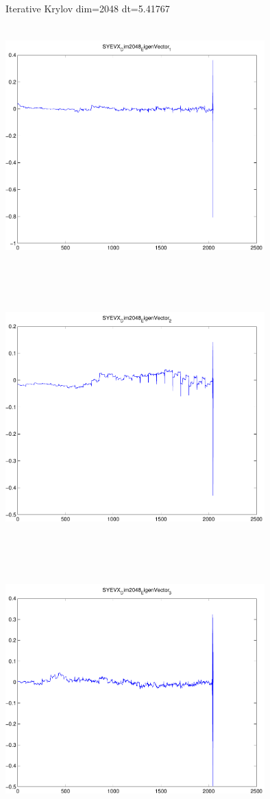 \documentclass[9pt]{article}
\theoremstyle{plain}
\theoremstyle{definition}
\theoremstyle{remark}
\numberwithin{equation}{section}
\begin{document}
Iterative Krylov dim=2048 dt=5.41767
\includegraphics[width=10.0cm,height=10.0cm]{SYEVX_Dim2048_EigenVector_1.pdf}

\includegraphics[width=10.0cm,height=10.0cm]{SYEVX_Dim2048_EigenVector_2.pdf}

\includegraphics[width=10.0cm,height=10.0cm]{SYEVX_Dim2048_EigenVector_3.pdf}
\end{document}

